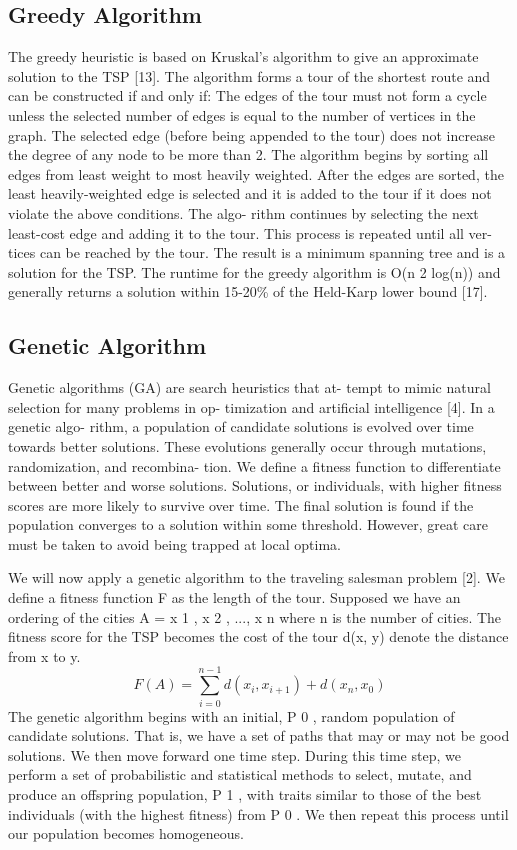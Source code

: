 \documentclass[10pt,twocolumn,letterpaper]{article}
\begin{document}
\subsection{Greedy Algorithm}
The greedy heuristic is based on Kruskal’s algorithm to
give an approximate solution to the TSP [13]. The algorithm
forms a tour of the shortest route and can be constructed if
and only if:
The edges of the tour must not form a cycle unless
the selected number of edges is equal to the number of
vertices in the graph.
The selected edge (before being appended to the tour)
does not increase the degree of any node to be more
than 2.
The algorithm begins by sorting all edges from least weight
to most heavily weighted. After the edges are sorted, the
least heavily-weighted edge is selected and it is added to the
tour if it does not violate the above conditions. The algo-
rithm continues by selecting the next least-cost edge and
adding it to the tour. This process is repeated until all ver-
tices can be reached by the tour. The result is a minimum
spanning tree and is a solution for the TSP. The runtime for
the greedy algorithm is O(n 2 log(n)) and generally returns a
solution within 15-20\% of the Held-Karp lower bound [17].

\subsection{Genetic Algorithm}
Genetic algorithms (GA) are search heuristics that at-
tempt to mimic natural selection for many problems in op-
timization and artificial intelligence [4]. In a genetic algo-
rithm, a population of candidate solutions is evolved over
time towards better solutions. These evolutions generally
occur through mutations, randomization, and recombina-
tion. We define a fitness function to differentiate between
better and worse solutions. Solutions, or individuals, with
higher fitness scores are more likely to survive over time.
The final solution is found if the population converges to a
solution within some threshold. However, great care must
be taken to avoid being trapped at local optima.

We will now apply a genetic algorithm to the traveling
salesman problem [2]. We define a fitness function F as the
length of the tour. Supposed we have an ordering of the
cities A = {x 1 , x 2 , ..., x n } where n is the number of cities.
The fitness score for the TSP becomes the cost of the tour
d(x, y) denote the distance from x to y.
\begin{equation}
	F(A) =\sum_{i=0}^{n-1} d(x_i , x_{i+1}) + d(x_n , x_0 )
\end{equation}
The genetic algorithm begins with an initial, P 0 , random
population of candidate solutions. That is, we have a set of
paths that may or may not be good solutions. We then move
forward one time step. During this time step, we perform a
set of probabilistic and statistical methods to select, mutate,
and produce an offspring population, P 1 , with traits similar
to those of the best individuals (with the highest fitness)
from P 0 . We then repeat this process until our population
becomes homogeneous.
\end{document}
